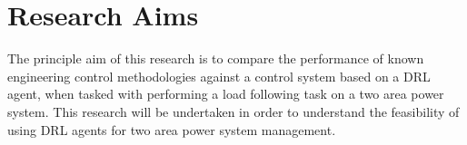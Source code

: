 \section{Research Aims}
The principle aim of this research is to compare the performance of known engineering control methodologies against a control system based on a DRL agent, when tasked with performing a load following task on a two area power system. This research will be undertaken in order to understand the feasibility of using DRL agents for two area power system management.